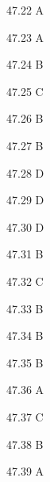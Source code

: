 \begin{Solution}{47.{22}}
A
\end{Solution}
\begin{Solution}{47.{23}}
A
\end{Solution}
\begin{Solution}{47.{24}}
B
\end{Solution}
\begin{Solution}{47.{25}}
C
\end{Solution}
\begin{Solution}{47.{26}}
B
\end{Solution}
\begin{Solution}{47.{27}}
B
\end{Solution}
\begin{Solution}{47.{28}}
D
\end{Solution}
\begin{Solution}{47.{29}}
D
\end{Solution}
\begin{Solution}{47.{30}}
D
\end{Solution}
\begin{Solution}{47.{31}}
B
\end{Solution}
\begin{Solution}{47.{32}}
C
\end{Solution}
\begin{Solution}{47.{33}}
B
\end{Solution}
\begin{Solution}{47.{34}}
B
\end{Solution}
\begin{Solution}{47.{35}}
B
\end{Solution}
\begin{Solution}{47.{36}}
A
\end{Solution}
\begin{Solution}{47.{37}}
C
\end{Solution}
\begin{Solution}{47.{38}}
B
\end{Solution}
\begin{Solution}{47.{39}}
A
\end{Solution}
